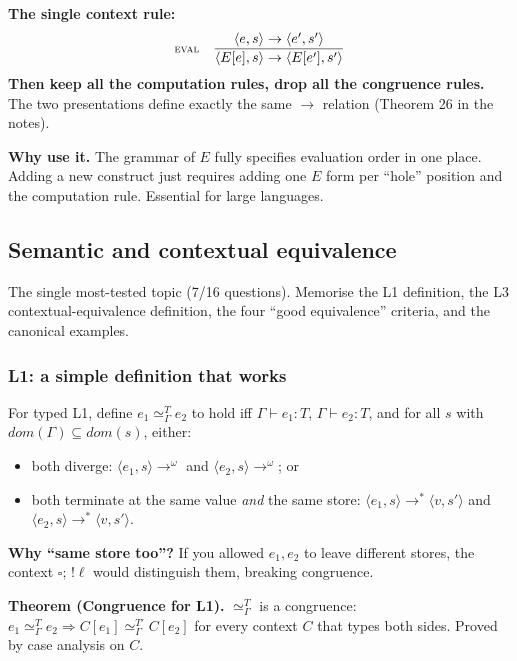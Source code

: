 \documentclass[11pt,a4paper]{article}
\newcommand{\rname}[1]{\textsc{\footnotesize#1}}
\begin{document}
\textbf{The single context rule:}
\[
\rname{eval}\quad \dfrac{\langle e, s\rangle \to \langle e', s'\rangle}{\langle E[e], s\rangle \to \langle E[e'], s'\rangle}
\]
\textbf{Then keep all the computation rules, drop all the congruence rules.} The two presentations define exactly the same $\to$ relation (Theorem 26 in the notes).

\textbf{Why use it.} The grammar of $E$ fully specifies evaluation order in one place. Adding a new construct just requires adding one $E$ form per ``hole'' position and the computation rule. Essential for large languages.

\subsection{Semantic and contextual equivalence}

\begin{must}
The single most-tested topic (7/16 questions). Memorise the L1 definition, the L3 contextual-equivalence definition, the four ``good equivalence'' criteria, and the canonical examples.
\end{must}

\subsubsection*{L1: a simple definition that works}

For typed L1, define $e_1 \simeq^T_\Gamma e_2$ to hold iff $\Gamma \vdash e_1 : T$, $\Gamma \vdash e_2 : T$, and for all $s$ with $\mathit{dom}(\Gamma) \subseteq \mathit{dom}(s)$, either:
\begin{itemize}[leftmargin=*,itemsep=0pt]
  \item[(a)] both diverge: $\langle e_1, s\rangle \to^\omega$ and $\langle e_2, s\rangle \to^\omega$; or
  \item[(b)] both terminate at the same value \emph{and} the same store: $\langle e_1, s\rangle \to^* \langle v, s'\rangle$ and $\langle e_2, s\rangle \to^* \langle v, s'\rangle$.
\end{itemize}

\textbf{Why ``same store too''?} If you allowed $e_1, e_2$ to leave different stores, the context $\square; \,!\ell$ would distinguish them, breaking congruence.

\textbf{Theorem (Congruence for L1).} $\simeq^T_\Gamma$ is a congruence: $e_1 \simeq^T_\Gamma e_2 \Rightarrow C[e_1] \simeq^{T'}_\Gamma C[e_2]$ for every context $C$ that types both sides. Proved by case analysis on $C$.
\end{document}
